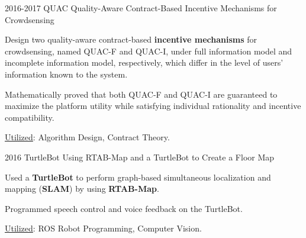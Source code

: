 \begin{cventries}
	
	\cvprojectentry
	{2016-2017 QUAC}
	{Quality-Aware Contract-Based Incentive Mechanisms for Crowdsensing}
	{
		\begin{cvitems} %
			\item Design two quality-aware contract-based \textbf{incentive mechanisms} for crowdsensing, named QUAC-F and QUAC-I, under full information model and incomplete information model, respectively, which differ in the level of users’ information known to the system.
			\item Mathematically proved that both QUAC-F and QUAC-I are guaranteed to maximize the platform utility while satisfying individual rationality and incentive compatibility.
			\item  \underline{Utilized}: Algorithm Design, Contract Theory.
		\end{cvitems}
	}
	
	
	\cvprojectentry
	{2016 TurtleBot}
	{Using RTAB-Map and a TurtleBot to Create a Floor Map}
	{
		\begin{cvitems} %
			\item Used a \textbf{TurtleBot} to perform graph-based simultaneous localization and mapping (\textbf{SLAM}) by using \textbf{RTAB-Map}.
			\item Programmed speech control and voice feedback on the TurtleBot.
			\item  \underline{Utilized}: ROS Robot Programming, Computer Vision.
		\end{cvitems}
	}
	
	
	

\end{cventries}

